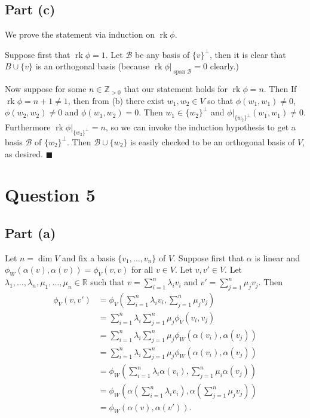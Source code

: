 \documentclass[12pt]{article}
\DeclareMathOperator{\rk}{rk}
\DeclareMathOperator{\spn}{span}
\begin{document}
\subsection*{Part (c)}
We prove the statement via induction on $\rk\phi$.

Suppose first that $\rk\phi=1$. Let $\mathcal{B}$ be any basis of $\{v\}^\perp$,
then it is clear that $B\cup\{v\}$ is an orthogonal basis
(because $\rk\phi|_{\spn\mathcal{B}}=0$ clearly.)

Now suppose for some $n\in\mathbb{Z}_{>0}$
that our statement holds for $\rk\phi=n$. Then If $\rk\phi=n+1\neq 1$, then
from (b) there
exist $w_1, w_2\in V$ so that $\phi(w_1, w_1)\neq 0$, $\phi(w_2,w_2)\neq 0$
and $\phi(w_1, w_2) = 0$. Then $w_1\in\{w_2\}^{\perp}$ and
$\phi|_{\{w_2\}^\perp}(w_1,w_1)\neq 0$. Furthermore
$\rk\phi|_{\{w_2\}^\perp}=n$, so we can invoke the induction hypothesis to
get a basis $\mathcal{B}$ of $\{w_2\}^{\perp}$. Then $\mathcal{B}\cup\{w_2\}$
is easily checked to be an orthogonal basis of $V$, as desired.
\hfill$\blacksquare$

\newpage
\section*{Question 5}
\subsection*{Part (a)}
Let $n=\dim V$ and fix a basis $\{v_1,\ldots,v_n\}$ of $V$.
Suppose first that $\alpha$ is linear and
$\phi_W(\alpha(v),\alpha(v))=\phi_V(v,v)$ for all $v\in V$.
Let $v,v'\in V$.
Let $\lambda_1,\ldots,\lambda_n,\mu_1,\ldots,\mu_n\in\mathbb{R}$ such that
$v=\sum_{i=1}^n \lambda_iv_i$ and $v'=\sum_{j=1}^n\mu_jv_j$. Then
\begin{align*}
    \phi_V(v, v')
    &=\phi_V\left(\sum_{i=1}^n \lambda_iv_i, \sum_{j=1}^n\mu_jv_j\right)
    \\&=\sum_{i=1}^n \lambda_i\sum_{j=1}^n\mu_j\phi_V\left(v_i,v_j\right)
    \\&=\sum_{i=1}^n \lambda_i\sum_{j=1}^n\mu_j\phi_W
        \left(\alpha(v_i),\alpha(v_j)\right)
    \\&=\sum_{i=1}^n \lambda_i\sum_{j=1}^n\mu_j\phi_W
        \left(\alpha(v_i),\alpha(v_j)\right)
    \\&=\phi_W\left(\sum_{i=1}^n \lambda_i\alpha(v_i),
        \sum_{j=1}^n\mu_i\alpha(v_j)\right)
    \\&=\phi_W\left(\alpha\left(\sum_{i=1}^n \lambda_iv_i\right),
        \alpha\left(\sum_{j=1}^n\mu_jv_j\right)\right)
    \\&=\phi_W(\alpha(v), \alpha(v')).
\end{align*}
\end{document}
